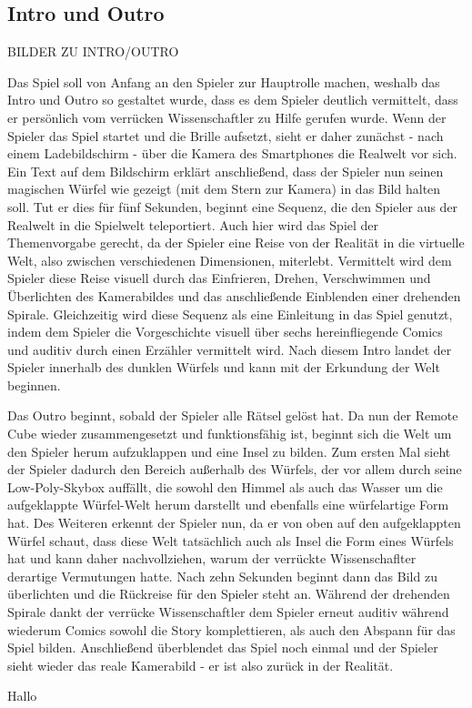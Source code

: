 \subsection{Intro und Outro}

BILDER ZU INTRO/OUTRO

Das Spiel soll von Anfang an den Spieler zur Hauptrolle machen, weshalb das Intro und Outro so gestaltet wurde, dass es dem Spieler deutlich vermittelt, dass er persönlich vom verrücken Wissenschaftler zu Hilfe gerufen wurde. Wenn der Spieler das Spiel startet und die Brille aufsetzt, sieht er daher zunächst - nach einem Ladebildschirm - über die Kamera des Smartphones die Realwelt vor sich. Ein Text auf dem Bildschirm erklärt anschließend, dass der Spieler nun seinen magischen Würfel wie gezeigt (mit dem Stern zur Kamera) in das Bild halten soll. Tut er dies für fünf Sekunden, beginnt eine Sequenz, die den Spieler aus der Realwelt in die Spielwelt teleportiert. Auch hier wird das Spiel der Themenvorgabe gerecht, da der Spieler eine Reise von der Realität in die virtuelle Welt, also zwischen verschiedenen Dimensionen, miterlebt. Vermittelt wird dem Spieler diese Reise visuell durch das Einfrieren, Drehen, Verschwimmen und Überlichten des Kamerabildes und das anschließende Einblenden einer drehenden Spirale. Gleichzeitig wird diese Sequenz als eine Einleitung in das Spiel genutzt, indem dem Spieler die Vorgeschichte visuell über sechs hereinfliegende Comics und auditiv durch einen Erzähler vermittelt wird. Nach diesem Intro landet der Spieler innerhalb des dunklen Würfels und kann mit der Erkundung der Welt beginnen.

Das Outro beginnt, sobald der Spieler alle Rätsel gelöst hat. Da nun der Remote Cube wieder zusammengesetzt und funktionsfähig ist, beginnt sich die Welt um den Spieler herum aufzuklappen und eine Insel zu bilden. Zum ersten Mal sieht der Spieler dadurch den Bereich außerhalb des Würfels, der vor allem durch seine Low-Poly-Skybox auffällt, die sowohl den Himmel als auch das Wasser um die aufgeklappte Würfel-Welt herum darstellt und ebenfalls eine würfelartige Form hat. Des Weiteren erkennt der Spieler nun, da er von oben auf den aufgeklappten Würfel schaut, dass diese Welt tatsächlich auch als Insel die Form eines Würfels hat und kann daher nachvollziehen, warum der verrückte Wissenschaflter derartige Vermutungen hatte. Nach zehn Sekunden beginnt dann das Bild zu überlichten und die Rückreise für den Spieler steht an. Während der drehenden Spirale dankt der verrücke Wissenschaftler dem Spieler erneut auditiv während wiederum Comics sowohl die Story komplettieren, als auch den Abspann für das Spiel bilden. Anschließend überblendet das Spiel noch einmal und der Spieler sieht wieder das reale Kamerabild - er ist also zurück in der Realität.



Hallo